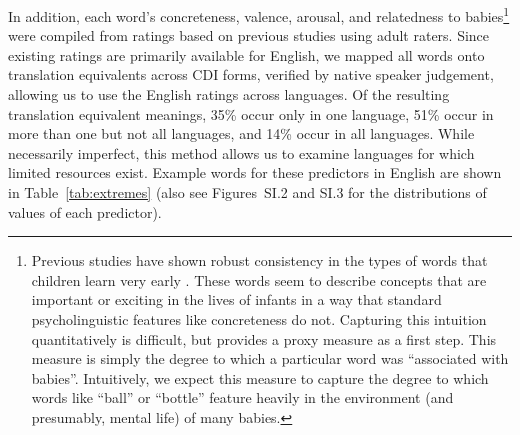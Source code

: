 \documentclass[manuscript]{stjour}
\begin{document}
In addition, each word's concreteness, valence, arousal, and relatedness
to babies\footnote{Previous studies have shown robust consistency in the
  types of words that children learn very early \citep{tardif2008}.
  These words seem to describe concepts that are important or exciting
  in the lives of infants in a way that standard psycholinguistic
  features like concreteness do not. Capturing this intuition
  quantitatively is difficult, but \citet{perry2015} provides a proxy
  measure as a first step. This measure is simply the degree to which a
  particular word was ``associated with babies''. Intuitively, we expect
  this measure to capture the degree to which words like ``ball'' or
  ``bottle'' feature heavily in the environment (and presumably, mental
  life) of many babies.} were compiled from ratings based on previous
studies using adult raters. Since existing ratings are primarily
available for English, we mapped all words onto translation equivalents
across CDI forms, verified by native speaker judgement, allowing us to
use the English ratings across languages. Of the resulting translation
equivalent meanings, 35\% occur only in one language, 51\% occur in more
than one but not all languages, and 14\% occur in all languages. While
necessarily imperfect, this method allows us to examine languages for
which limited resources exist. Example words for these predictors in
English are shown in Table~\ref{tab:extremes} (also see
Figures~SI.2 and SI.3 for the distributions of values of each predictor).

\begin{table}[t]

\caption{\label{tab:extremes}Items with the highest and lowest values for each predictor in English.}
\centering
{}
\end{table}
\end{document}
